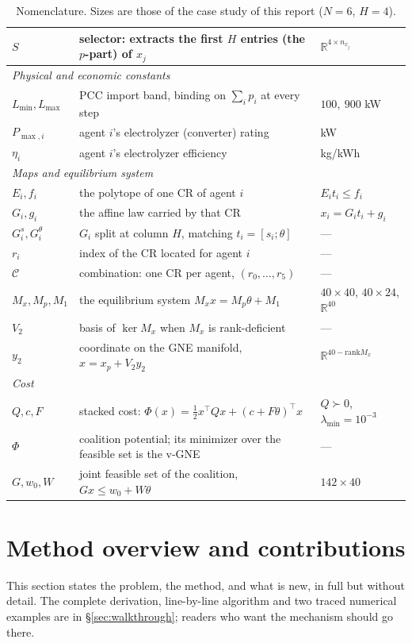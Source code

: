 \documentclass[11pt, letterpaper]{article}
\begin{document}
\begin{table}[H]
\begin{tabular}{lll}
$S$          & selector: extracts the first $H$ entries (the $p$-part) of $x_j$ & $\mathbb R^{4\times n_{x_j}}$\\
\midrule
\multicolumn{3}{l}{\emph{Physical and economic constants}}\\
$L_{\min},L_{\max}$ & PCC import band, binding on $\sum_ip_i$ at every step & $100,\ 900$ kW\\
$P_{\max,i}$ & agent $i$'s electrolyzer (converter) rating & kW\\
$\eta_i$     & agent $i$'s electrolyzer efficiency & kg/kWh\\
\midrule
\multicolumn{3}{l}{\emph{Maps and equilibrium system}}\\
$E_i,f_i$    & the polytope of one CR of agent $i$ & $E_it_i\le f_i$\\
$G_i,g_i$    & the affine law carried by that CR & $x_i=G_it_i+g_i$\\
$G_i^{s},G_i^{\theta}$ & $G_i$ split at column $H$, matching $t_i=[s_i;\theta]$ & --- \\
$r_i$        & index of the CR located for agent $i$ & --- \\
$\mathcal C$ & combination: one CR per agent, $(r_0,\dots,r_5)$ & --- \\
$M_x,M_p,M_1$& the equilibrium system $M_xx=M_p\theta+M_1$ & $40{\times}40$, $40{\times}24$, $\mathbb R^{40}$\\
$V_2$        & basis of $\ker M_x$ when $M_x$ is rank-deficient & --- \\
$y_2$        & coordinate on the GNE manifold, $x=x_p+V_2y_2$ & $\mathbb R^{40-\mathrm{rank}M_x}$\\
\midrule
\multicolumn{3}{l}{\emph{Cost}}\\
$Q,c,F$      & stacked cost: $\Phi(x)=\tfrac12x^\top Qx+(c+F\theta)^\top x$ & $Q\succ0$, $\lambda_{\min}=10^{-3}$\\
$\Phi$       & coalition potential; its minimizer over the feasible set is the v-GNE & --- \\
$G,w_0,W$    & joint feasible set of the coalition, $Gx\le w_0+W\theta$ & $142\times40$\\
\bottomrule
\end{tabular}
\caption{Nomenclature. Sizes are those of the case study of this report ($N{=}6$, $H{=}4$).}
\label{tab:nomen}
\end{table}

\section{Method overview and contributions}\label{sec:overview}
This section states the problem, the method, and what is new, in full but without detail. The complete
derivation, line-by-line algorithm and two traced numerical examples are in
\S\ref{sec:walkthrough}; readers who want the mechanism should go there.
\end{document}
